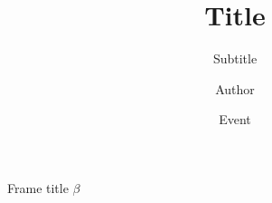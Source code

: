 \documentclass{beamer}
\title{Title}
\subtitle{Subtitle}
\author{Author}
\institute{Institute}
\date{Event}
\begin{document}
\frame{\titlepage}

\begin{frame}{Frame title}
\blindtext\alpha$\beta$
\end{frame}
\end{document}
